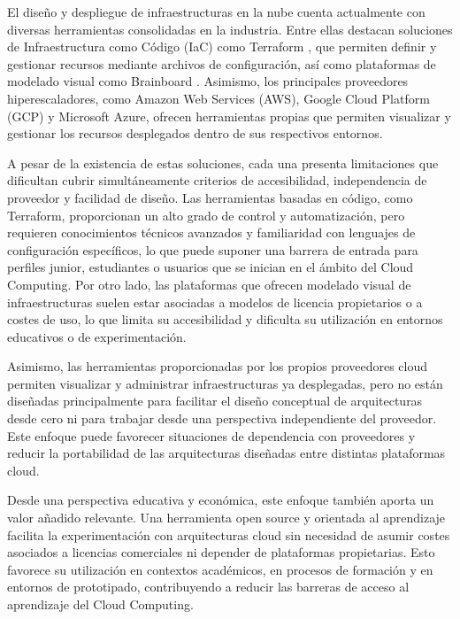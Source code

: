 \documentclass{article}
\begin{document}
    {                    
        \setlength{\parskip}{1em}   

        \justify 
        El diseño y despliegue de infraestructuras en la nube cuenta actualmente con diversas herramientas consolidadas en la industria. Entre ellas destacan soluciones de Infraestructura como Código (IaC) como Terraform \cite{noauthor_que_2025}, que permiten definir y gestionar recursos mediante archivos de configuración, así como plataformas de modelado visual como Brainboard \cite{noauthor_brainboard_nodate}. Asimismo, los principales proveedores hiperescaladores, como Amazon Web Services (AWS), Google Cloud Platform (GCP) y Microsoft Azure, ofrecen herramientas propias que permiten visualizar y gestionar los recursos desplegados dentro de sus respectivos entornos.
        \par 
    
        \justify 
        A pesar de la existencia de estas soluciones, cada una presenta limitaciones que dificultan cubrir simultáneamente criterios de accesibilidad, independencia de proveedor y facilidad de diseño. Las herramientas basadas en código, como Terraform, proporcionan un alto grado de control y automatización, pero requieren conocimientos técnicos avanzados y familiaridad con lenguajes de configuración específicos, lo que puede suponer una barrera de entrada para perfiles junior, estudiantes o usuarios que se inician en el ámbito del Cloud Computing. Por otro lado, las plataformas que ofrecen modelado visual de infraestructuras suelen estar asociadas a modelos de licencia propietarios o a costes de uso, lo que limita su accesibilidad y dificulta su utilización en entornos educativos o de experimentación.
        \par 
    
        \justify 
        Asimismo, las herramientas proporcionadas por los propios proveedores cloud permiten visualizar y administrar infraestructuras ya desplegadas, pero no están diseñadas principalmente para facilitar el diseño conceptual de arquitecturas desde cero ni para trabajar desde una perspectiva independiente del proveedor. Este enfoque puede favorecer situaciones de dependencia con proveedores y reducir la portabilidad de las arquitecturas diseñadas entre distintas plataformas cloud.
        \par 

        \justify
        Desde una perspectiva educativa y económica, este enfoque también aporta un valor añadido relevante. Una herramienta open source y orientada al aprendizaje facilita la experimentación con arquitecturas cloud sin necesidad de asumir costes asociados a licencias comerciales ni depender de plataformas propietarias. Esto favorece su utilización en contextos académicos, en procesos de formación y en entornos de prototipado, contribuyendo a reducir las barreras de acceso al aprendizaje del Cloud Computing.
        \par
        
}
\end{document}
